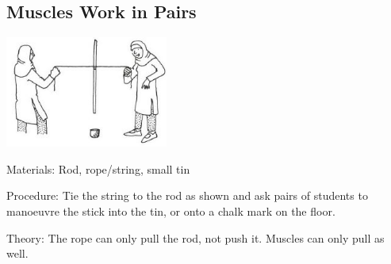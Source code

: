 \begin{multicols}{2}
\subsection{Muscles Work in Pairs}

\begin{center}
\includegraphics[width=0.4\textwidth]{./img/vso/muscle-pairs.jpg}
\end{center}

\begin{description*}
\item[Materials:]{Rod, rope/string, small tin}
\item[Procedure:]{Tie the string to the rod as shown
and ask pairs of students to
manoeuvre the stick into the tin,
or onto a chalk mark on the floor.
}
\item[Theory:]{The rope can only pull the rod,
not push it. Muscles can only pull
as well.}
\end{description*}



\end{multicols}

\pagebreak